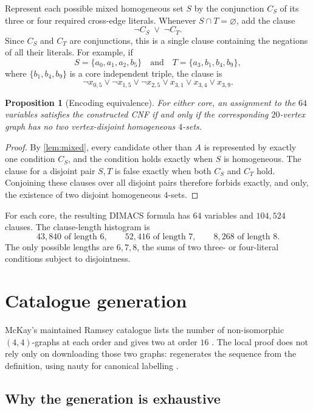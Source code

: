 \documentclass[11pt,a4paper]{article}
\newtheorem{proposition}[theorem]{Proposition}
\theoremstyle{definition}
\theoremstyle{remark}
\newcommand{\artifact}[1]{\texttt{\detokenize{#1}}}
\begin{document}
Represent each possible mixed homogeneous set \(S\) by the conjunction
\(C_S\) of its three or four required cross-edge literals.  Whenever
\(S\cap T=\varnothing\), add the clause
\[
  \neg C_S\;\lor\;\neg C_T.
\]
Since \(C_S\) and \(C_T\) are conjunctions, this is a single clause
containing the negations of all their literals.  For example, if
\[
S=\{a_0,a_1,a_2,b_5\}
\quad\text{and}\quad
T=\{a_3,b_1,b_4,b_9\},
\]
where \(\{b_1,b_4,b_9\}\) is a core independent triple, the clause is
\[
\neg x_{0,5}\vee\neg x_{1,5}\vee\neg x_{2,5}\vee
x_{3,1}\vee x_{3,4}\vee x_{3,9}.
\]

\begin{proposition}[Encoding equivalence]\label{prop:encoding}
For either core, an assignment to the \(64\) variables satisfies the
constructed CNF if and only if the corresponding \(20\)-vertex graph has
no two vertex-disjoint homogeneous \(4\)-sets.
\end{proposition}

\begin{proof}
By \cref{lem:mixed}, every candidate other than \(A\) is represented by
exactly one condition \(C_S\), and the condition holds exactly when \(S\)
is homogeneous.  The clause for a disjoint pair \(S,T\) is false exactly
when both \(C_S\) and \(C_T\) hold.  Conjoining these clauses over all
disjoint pairs therefore forbids exactly, and only, the existence of two
disjoint homogeneous \(4\)-sets.
\end{proof}

For each core, the resulting DIMACS formula has \(64\) variables and
\(104{,}524\) clauses.  The clause-length histogram is
\[
  43{,}840\text{ of length }6,\qquad
  52{,}416\text{ of length }7,\qquad
  8{,}268\text{ of length }8.
\]
The only possible lengths are \(6,7,8\), the sums of two three- or
four-literal conditions subject to disjointness.

\section{Catalogue generation}\label{sec:catalogue}

McKay's maintained Ramsey catalogue lists the number of non-isomorphic
\((4,4)\)-graphs at each order and gives two at order \(16\)
\cite{mckay-catalogue}.  The local proof does not rely only on downloading
those two graphs: \artifact{nauty/gen44.c} regenerates the sequence from
the definition, using nauty for canonical labelling
\cite{mckay-piperno}.

\subsection{Why the generation is exhaustive}
\end{document}
